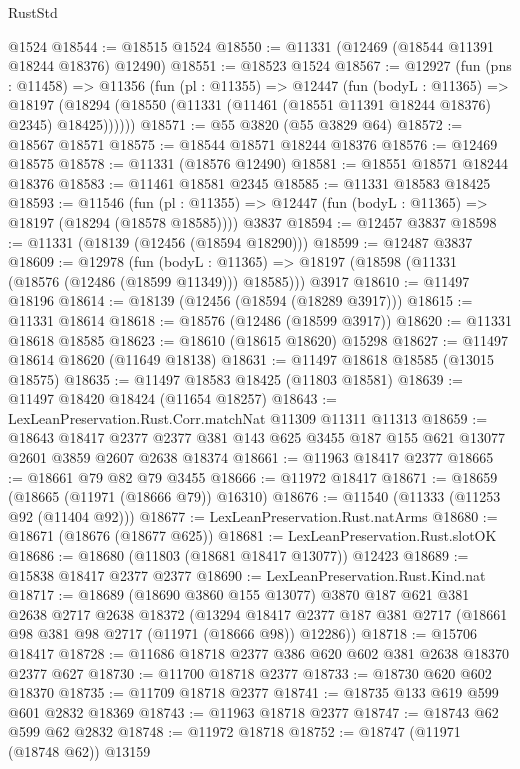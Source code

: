 \begin{lexlean}{RustStd}
\begin{coremodule}
    @1524
@18544 := @18515 @1524
@18550 := @11331 (@12469 (@18544 @11391 @18244 @18376) @12490)
@18551 := @18523 @1524
@18567 := @12927
    (fun (pns : @11458) =>
    @11356
      (fun (pl : @11355) =>
      @12447
        (fun (bodyL : @11365) =>
        @18197 (@18294 (@18550 (@11331 (@11461 (@18551 @11391 @18244 @18376) @2345) @18425))))))
@18571 := @55 @3820 (@55 @3829 @64)
@18572 := @18567 @18571
@18575 := @18544 @18571 @18244 @18376
@18576 := @12469 @18575
@18578 := @11331 (@18576 @12490)
@18581 := @18551 @18571 @18244 @18376
@18583 := @11461 @18581 @2345
@18585 := @11331 @18583 @18425
@18593 := @11546
    (fun (pl : @11355) => @12447 (fun (bodyL : @11365) => @18197 (@18294 (@18578 @18585))))
    @3837
@18594 := @12457 @3837
@18598 := @11331 (@18139 (@12456 (@18594 @18290)))
@18599 := @12487 @3837
@18609 := @12978
    (fun (bodyL : @11365) => @18197 (@18598 (@11331 (@18576 (@12486 (@18599 @11349))) @18585)))
    @3917
@18610 := @11497 @18196
@18614 := @18139 (@12456 (@18594 (@18289 @3917)))
@18615 := @11331 @18614
@18618 := @18576 (@12486 (@18599 @3917))
@18620 := @11331 @18618 @18585
@18623 := @18610 (@18615 @18620) @15298
@18627 := @11497 @18614 @18620 (@11649 @18138)
@18631 := @11497 @18618 @18585 (@13015 @18575)
@18635 := @11497 @18583 @18425 (@11803 @18581)
@18639 := @11497 @18420 @18424 (@11654 @18257)
@18643 := LexLeanPreservation.Rust.Corr.matchNat @11309 @11311 @11313
@18659 := @18643
    @18417
    @2377
    @2377
    @381
    @143
    @625
    @3455
    @187
    @155
    @621
    @13077
    @2601
    @3859
    @2607
    @2638
    @18374
@18661 := @11963 @18417 @2377
@18665 := @18661 @79 @82 @79 @3455
@18666 := @11972 @18417
@18671 := @18659 (@18665 (@11971 (@18666 @79)) @16310)
@18676 := @11540 (@11333 (@11253 @92 (@11404 @92)))
@18677 := LexLeanPreservation.Rust.natArms
@18680 := @18671 (@18676 (@18677 @625))
@18681 := LexLeanPreservation.Rust.slotOK
@18686 := @18680 (@11803 (@18681 @18417 @13077)) @12423
@18689 := @15838 @18417 @2377 @2377
@18690 := LexLeanPreservation.Rust.Kind.nat
@18717 := @18689
    (@18690 @3860 @155 @13077)
    @3870
    @187
    @621
    @381
    @2638
    @2717
    @2638
    @18372
    (@13294 @18417 @2377 @187 @381 @2717 (@18661 @98 @381 @98 @2717 (@11971 (@18666 @98)) @12286))
@18718 := @15706 @18417
@18728 := @11686 @18718 @2377 @386 @620 @602 @381 @2638 @18370 @2377 @627
@18730 := @11700 @18718 @2377
@18733 := @18730 @620 @602 @18370
@18735 := @11709 @18718 @2377
@18741 := @18735 @133 @619 @599 @601 @2832 @18369
@18743 := @11963 @18718 @2377
@18747 := @18743 @62 @599 @62 @2832
@18748 := @11972 @18718
@18752 := @18747 (@11971 (@18748 @62)) @13159

\end{coremodule}
\end{lexlean}
